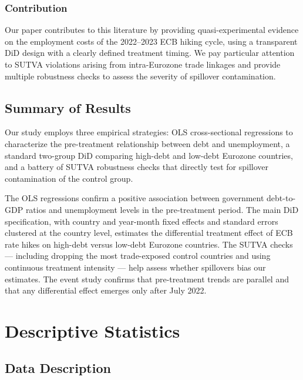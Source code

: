 \documentclass[12pt,a4paper]{article}
\begin{document}
\subsubsection{Contribution}

Our paper contributes to this literature by providing quasi-experimental evidence on the employment costs of the 2022--2023 ECB hiking cycle, using a transparent DiD design with a clearly defined treatment timing. We pay particular attention to SUTVA violations arising from intra-Eurozone trade linkages and provide multiple robustness checks to assess the severity of spillover contamination.

\subsection{Summary of Results}

Our study employs three empirical strategies: OLS cross-sectional regressions to characterize the pre-treatment relationship between debt and unemployment, a standard two-group DiD comparing high-debt and low-debt Eurozone countries, and a battery of SUTVA robustness checks that directly test for spillover contamination of the control group.

The OLS regressions confirm a positive association between government debt-to-GDP ratios and unemployment levels in the pre-treatment period. The main DiD specification, with country and year-month fixed effects and standard errors clustered at the country level, estimates the differential treatment effect of ECB rate hikes on high-debt versus low-debt Eurozone countries. The SUTVA checks --- including dropping the most trade-exposed control countries and using continuous treatment intensity --- help assess whether spillovers bias our estimates. The event study confirms that pre-treatment trends are parallel and that any differential effect emerges only after July 2022.

\section{Descriptive Statistics}

\subsection{Data Description}
\end{document}
